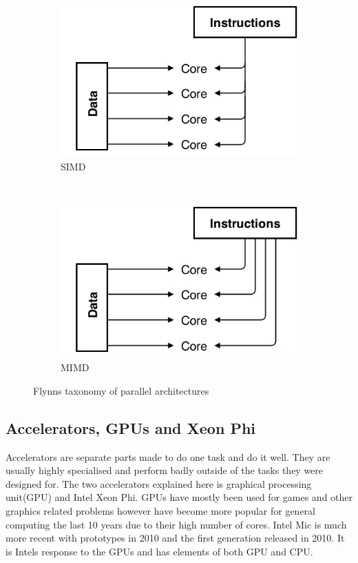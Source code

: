 \documentclass[10pt,a4paper]{report}
\begin{document}
\begin{figure}
        \begin{subfigure}[b]{0.48\textwidth}
                \includegraphics[width=\textwidth]{SIMD}
                \caption{SIMD}
                \label{fig:SIMD}
        \end{subfigure}
        ~
        \begin{subfigure}[b]{0.48\textwidth}
                \includegraphics[width=\textwidth]{MIMD}
                \caption{MIMD}
                \label{fig:MIMD}
        \end{subfigure}
        \caption{Flynns taxonomy of parallel architectures\cite{introduction_hpc_hager}}\label{fig:flynn_taxonomy}
\end{figure}

\subsection{Accelerators, GPUs and Xeon Phi}
\label{gpu}
Accelerators are separate parts made to do one task and do it well. They are usually highly specialised and perform badly outside of the tasks they were designed for. The two accelerators explained here is graphical processing unit(GPU) and Intel Xeon Phi\cite{cuda, jeffers2013intel}. GPUs have mostly been used for games and other graphics related problems however have become more popular for general computing the last 10 years due to their high number of cores\cite{cuda}.  Intel Mic is much more recent with prototypes in 2010 and the first generation released in 2010\cite{jeffers2013intel}. It is Intels response to the GPUs and has elements of both GPU and CPU\cite{jeffers2013intel}.
\end{document}
